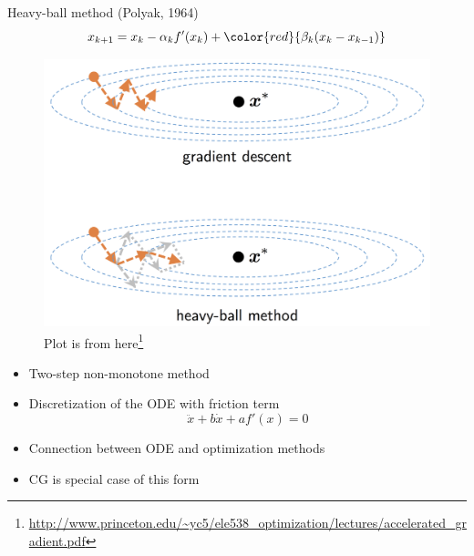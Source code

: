 \documentclass{beamer}
\begin{document}
\begin{frame}{Heavy-ball method (Polyak, 1964)}
\[
x_{k+1} = x_k - \alpha_k f'(x_k) + {\color{red}{\beta_k(x_k - x_{k-1})}}
\]
\begin{figure}
\centering
\includegraphics[scale=0.1]{heavy_ball.png}
\caption{Plot is from here\footnote{\url{http://www.princeton.edu/~yc5/ele538_optimization/lectures/accelerated_gradient.pdf}}}
\end{figure}

\begin{itemize}
\item Two-step non-monotone method
\item Discretization of the ODE with friction term
\[
\ddot x + b \dot x + a f'(x) = 0
\] 
\item Connection between ODE and optimization methods
\item CG is special case of this form
\end{itemize}

\end{frame}
\end{document}
